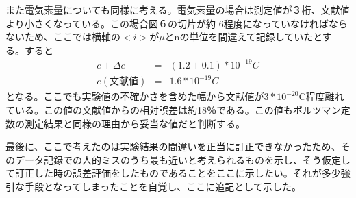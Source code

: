 \documentclass[11pt,a4j]{jsarticle}
\begin{document}
  また電気素量についても同様に考える。電気素量の場合は測定値が３桁、文献値より小さくなっている。この場合図６の切片が約-6程度になっていなければならないため、ここでは横軸の$<i>$が$\mu$とnの単位を間違えて記録していたとする。すると
  \begin{eqnarray}
   e \pm \Delta e &=& (1.2 \pm 0.1) * 10^{-19} C \nonumber \\
   e(文献値) &=& 1.6 * 10^{-19} C \nonumber
  \end{eqnarray}
  となる。ここでも実験値の不確かさを含めた幅から文献値が$3*10^{-20}$C程度離れている。この値の文献値からの相対誤差は約18％である。この値もボルツマン定数の測定結果と同様の理由から妥当な値だと判断する。
  
  最後に、ここで考えたのは実験結果の間違いを正当に訂正できなかったため、そのデータ記録での人的ミスのうち最も近いと考えられるものを示し、そう仮定して訂正した時の誤差評価をしたものであることをここに示したい。それが多少強引な手段となってしまったことを自覚し、ここに追記として示した。
  
  
\end{document}

